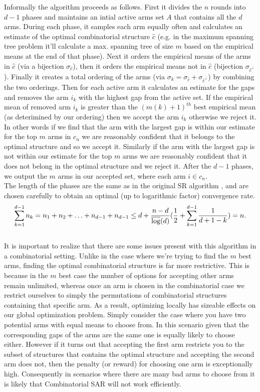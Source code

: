 \documentclass[11.75pt,oneside]{amsart}
\begin{document}
Informally the algorithm proceeds as follows. First it divides the $n$ rounds into $d-1$ phases and maintains an intial active arms set $A$ that contains all the $d$ arms. During each phase, it samples each arm equally often and calculates an estimate of the optimal combinatorial structure $\hat{c}$ (e.g. in the maximum spanning tree problem it'll calculate a max. spanning tree of size $m$ based on the empirical means at the end of that phase). Next it orders the empirical means of the arms in $\hat{c}$ (via a bijection $\sigma_{\hat{c}}$), then it orders the empirical means not in $\hat{c}$ (bijection $\sigma_{\hat{c}^{\perp}}$). Finally it creates a total ordering of the arms (via $\sigma_k = \sigma_{\hat{c}} + \sigma_{\hat{c}^{\perp}}$) by combining the two orderings. Then for each active arm it calculates an estimate for the gaps and removes the arm $i_k$ with the highest gap from the active set. If the empirical mean of removed arm $i_k$ is greater than the $(m(k)+1)^{th}$ best empirical mean (as deterimined by our ordering) then we accept the arm $i_k$ otherwise we reject it. In other words if we find that the arm with the largest gap is within our estimate for the top $m$ arms in $c_n$ we are reasonably confident that it belongs to the optimal structure and so we accept it. Similarly if the arm with the largest gap is not within our estimate for the top $m$ arms we are reasonably confident that it does not belong in the optimal structure and we reject it. After the $d-1$ phases, we output the $m$ arms in our accepted set, where each arm $i \in c_n$.\\

The length of the phases are the same as in the original SR algorithm \cite{ABM10}, and are chosen carefully to obtain an optimal (up to logarithmic factor) convergence rate.
$$ \sum_{k=1}^{d-1} n_k = n_1 + n_2 + \hdots + n_{d-1} + n_{d-1} \le d + \frac{n-d}{\overline{\log}(d)} (\frac{1}{2} + \sum_{k=1}^{d-1} \frac{1}{d+1-k}) = n. $$\\

It is important to realize that there are some issues present with this algorithm in a combinatorial setting. Unlike in the case where we're trying to find the $m$ best arms, finding the optimal combinatorial structure is far more restrictive. This is because in the $m$ best case the number of options for accepting other arms remain unlimited, whereas once an arm is chosen in the combinatorial case we restrict ourselves to simply the permutations of combinatorial structures containing that specific arm. As a result, optimizing locally has sizeable effects on our global optimization problem. Simply consider the case where you have two potential arms with equal means to choose from. In this scenario given that the corresponding gaps of the arms are the same one is equally likely to choose either. However if it turns out that accepting the first arm restricts you to the subset of structures that contains the optimal structure and accepting the second arm does not, then the penalty (or reward) for choosing one arm is exceptionally high. Consequently in scenarios where there are many bad arms to choose from it is likely that Combinatorial SAR will not work efficiently.\\
\end{document}
